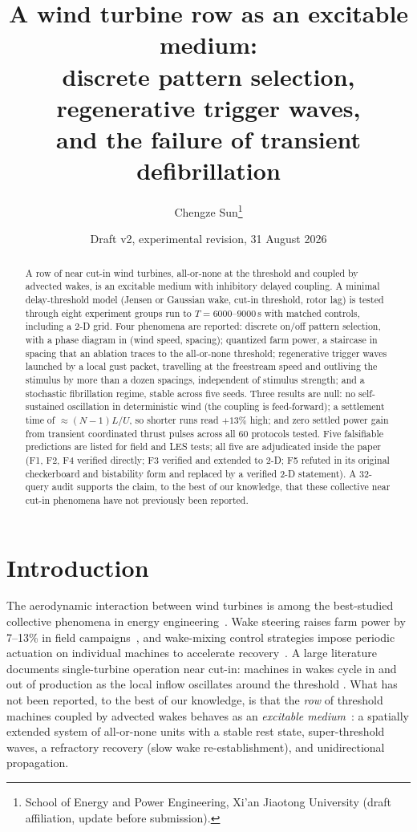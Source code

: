 \documentclass[11pt]{article}
\title{A wind turbine row as an excitable medium:\\
discrete pattern selection, regenerative trigger waves,\\
and the failure of transient defibrillation}
\author{Chengze Sun\thanks{School of Energy and Power Engineering, Xi'an Jiaotong University (draft affiliation, update before submission).}}
\date{Draft v2, experimental revision, 31 August 2026}
\begin{document}
\maketitle

\begin{abstract}
A row of near cut-in wind turbines, all-or-none at the threshold and coupled by advected
wakes, is an excitable medium with inhibitory delayed coupling. A minimal delay-threshold
model (Jensen or Gaussian wake, cut-in threshold, rotor lag) is tested through eight
experiment groups run to $T=6000$--$9000$\,s with matched controls, including a 2-D grid. Four phenomena are
reported: discrete on/off pattern selection, with a phase diagram in (wind speed, spacing);
quantized farm power, a staircase in spacing that an ablation traces to the all-or-none
threshold; regenerative trigger waves launched by a local gust packet, travelling at the
freestream speed and outliving the stimulus by more than a dozen spacings, independent of
stimulus strength; and a stochastic fibrillation regime, stable across five seeds. Three
results are null: no self-sustained oscillation in deterministic wind (the coupling is
feed-forward); a settlement time of $\approx (N-1)L/U$, so shorter runs read $+13\%$ high;
and zero settled power gain from transient coordinated thrust pulses across all 60
protocols tested. Five falsifiable predictions are listed for field and LES tests; all five
are adjudicated inside the paper (F1, F2, F4 verified directly; F3 verified and extended to
2-D; F5 refuted in its original checkerboard and bistability form and replaced by a verified
2-D statement). A 32-query audit supports the claim, to the best of our
knowledge, that these collective near cut-in phenomena have not previously been reported.
\end{abstract}

\section{Introduction}

\label{sec:intro}

The aerodynamic interaction between wind turbines is among the best-studied collective
phenomena in energy engineering~\cite{Jensen1983,Bastankhah2016}. Wake steering raises farm
power by 7--13\% in field campaigns~\cite{Howland2019}, and wake-mixing control strategies impose
periodic actuation on individual machines to accelerate recovery~\cite{Korb2020,VanVondelen2024}.
A large literature documents single-turbine operation near cut-in: machines in wakes cycle
in and out of production as the local inflow oscillates around the threshold
\cite{Howland2019,Anvari2016}. What has not been reported, to the best of our knowledge,
is that the \emph{row} of threshold machines coupled by advected wakes behaves as an
\emph{excitable medium}~\cite{HodgkinHuxley1952,FitzHugh1961}: a spatially extended system
of all-or-none units with a stable rest state, super-threshold waves, a refractory recovery (slow wake
re-establishment), and unidirectional propagation.
\end{document}
